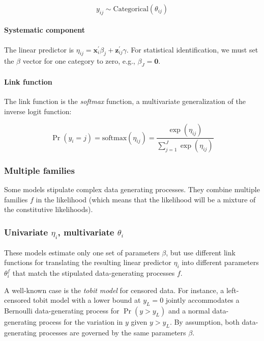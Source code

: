 \documentclass[
  11pt,
]{article}
\begin{document}
\[y_{ij} \sim \text{Categorical}(\theta_{ij})\]

\hypertarget{systematic-component-1}{%
\paragraph{Systematic component}\label{systematic-component-1}}

The linear predictor is \(\eta_{ij} = \mathbf{x}_i^{\prime}\beta_j + \mathbf{z}_{ij}^{\prime} \gamma\). For statistical identification, we must set the \(\beta\) vector for one category to zero, e.g., \(\beta_J = \mathbf{0}\).

\hypertarget{link-function-1}{%
\paragraph{Link function}\label{link-function-1}}

The link function is the \emph{softmax} function, a multivariate generalization of the inverse logit function:

\[\Pr(y_i = j) = \text{softmax}(\eta_{ij}) = \frac{\exp (\eta_{ij})}{\sum_{j=1}^{J} \exp(\eta_{ij})}\]

\hypertarget{multiple-families}{%
\subsubsection{Multiple families}\label{multiple-families}}

Some models stipulate complex data generating processes. They combine multiple families \(f\) in the likelihood (which means that the likelihood will be a mixture of the constitutive likelihoods).

\hypertarget{univariate-eta_i-multivariate-theta_i-1}{%
\subsubsection{\texorpdfstring{Univariate \(\eta_i\), multivariate \(\theta_i\)}{Univariate \textbackslash eta\_i, multivariate \textbackslash theta\_i}}\label{univariate-eta_i-multivariate-theta_i-1}}

These models estimate only one set of parameters \(\beta\), but use different link functions for translating the resulting linear predictor \(\eta_i\) into different parameters \(\theta_i^{f}\) that match the stipulated data-generating processes \(f\).

A well-known case is the \emph{tobit model} for censored data. For instance, a left-censored tobit model with a lower bound at \(y_L = 0\) jointly accommodates a Bernoulli data-generating process for \(\Pr(y > y_L)\) and a normal data-generating process for the variation in \(y\) given \(y > y_L\). By assumption, both data-generating processes are governed by the same parameters \(\beta\).
\end{document}

